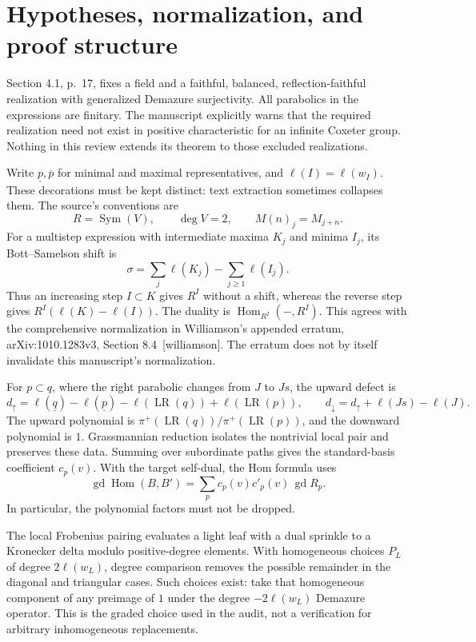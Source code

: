 \documentclass[10pt]{article}
\begin{document}
\section*{Hypotheses, normalization, and proof structure}
Section 4.1, p. 17, fixes a field and a faithful, balanced, reflection-faithful realization with generalized Demazure surjectivity. All parabolics in the expressions are finitary. The manuscript explicitly warns that the required realization need not exist in positive characteristic for an infinite Coxeter group. Nothing in this review extends its theorem to those excluded realizations.\par
Write \(\underline p,\overline p\) for minimal and maximal representatives, and \(\ell(I)=\ell(w_I)\). These decorations must be kept distinct: text extraction sometimes collapses them. The source’s conventions are \[R=\operatorname{Sym}(V),\qquad \deg V=2,\qquad
 M(n)_j=M_{j+n}.\] For a multistep expression with intermediate maxima \(K_j\) and minima \(I_j\), its Bott–Samelson shift is \[\sigma=\sum_j\ell(K_j)-\sum_{j\geq1}\ell(I_j).\] Thus an increasing step \(I\subset K\) gives \(R^I\) without a shift, whereas the reverse step gives \(R^I(\ell(K)-\ell(I))\). The duality is \(\operatorname{Hom}_{R^I}(-,R^I)\). This agrees with the comprehensive normalization in Williamson’s appended erratum, arXiv:1010.1283v3, Section 8.4 [williamson]. The erratum does not by itself invalidate this manuscript’s normalization.\par
For \(p\subset q\), where the right parabolic changes from \(J\) to \(Js\), the upward defect is \[d_\uparrow=\ell(\underline q)-\ell(\underline p)
             -\ell(\operatorname{LR}(q))+\ell(\operatorname{LR}(p)),
 \qquad
 d_\downarrow=d_\uparrow+\ell(Js)-\ell(J).\] The upward polynomial is \(\pi^+(\operatorname{LR}(q))/\pi^+(\operatorname{LR}(p))\), and the downward polynomial is \(1\). Grassmannian reduction isolates the nontrivial local pair and preserves these data. Summing over subordinate paths gives the standard-basis coefficient \(c_p(v)\). With the target self-dual, the Hom formula uses \[\operatorname{gd}\operatorname{Hom}(B,B')=\sum_p c_p(v)c'_p(v)\,\operatorname{gd}R_p .\] In particular, the polynomial factors must not be dropped.\par
The local Frobenius pairing evaluates a light leaf with a dual sprinkle to a Kronecker delta modulo positive-degree elements. With homogeneous choices \(P_L\) of degree \(2\ell(w_L)\), degree comparison removes the possible remainder in the diagonal and triangular cases. Such choices exist: take that homogeneous component of any preimage of \(1\) under the degree \(-2\ell(w_L)\) Demazure operator. This is the graded choice used in the audit, not a verification for arbitrary inhomogeneous replacements.\par
\end{document}

